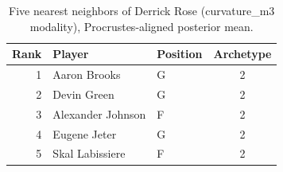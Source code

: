 \begin{table}[htbp]
  \centering\small
  \begin{tabular}{rllc}
    \toprule
    Rank & Player & Position & Archetype \\
    \midrule
    1 & Aaron Brooks & G & 2 \\
    2 & Devin Green & G & 2 \\
    3 & Alexander Johnson & F & 2 \\
    4 & Eugene Jeter & G & 2 \\
    5 & Skal Labissiere & F & 2 \\
    \bottomrule
  \end{tabular}
  \caption{Five nearest neighbors of Derrick Rose (curvature_m3 modality), Procrustes-aligned posterior mean.}
  \label{tab:Derrick_Rose_neighbors_curvature_m3}
\end{table}

